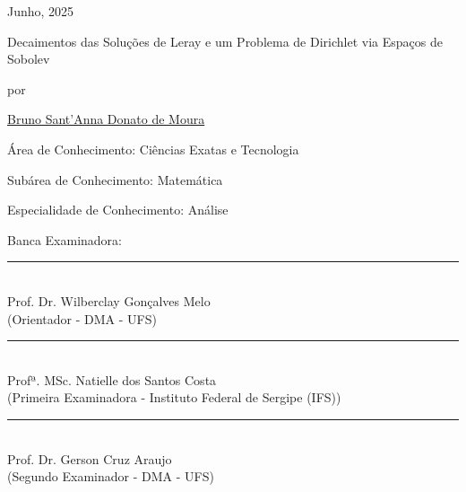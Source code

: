 \vspace{1cm}
\begin{center}
		Junho, 2025
\end{center}

\pagebreak

\thispagestyle{empty}

\begin{center}
\Large{Decaimentos das Soluções de Leray e um Problema de Dirichlet via Espaços de Sobolev}


\vspace{0.5cm}

{por}

\vspace{1.0cm}

\href{http://lattes.cnpq.br/4171937682648273}
{\large{Bruno Sant'Anna Donato de Moura}}
\end{center}

\vspace{1.0cm}

\noindent Área de Conhecimento: Ciências Exatas e Tecnologia

\noindent Subárea de Conhecimento: Matemática

\noindent Especialidade de Conhecimento: Análise

\vspace{1.0cm}

\noindent Banca Examinadora:

\vspace{2.5cm}


\begin{center}
\rule{10cm}{.1mm} \\
{Prof. Dr. Wilberclay Gonçalves Melo } \\
(Orientador - DMA - UFS)
\vspace{0.8cm}


\rule{10cm}{.1mm} \\
{Profª. MSc. Natielle dos Santos Costa} \\
(Primeira Examinadora - Instituto Federal de Sergipe (IFS))
\vspace{0.8cm}


\rule{10cm}{.1mm} \\
{Prof. Dr. Gerson Cruz Araujo} \\
(Segundo Examinador - DMA - UFS)
\vspace{0.8cm}

\end{center}

\pagebreak

\thispagestyle{empty}

\mbox{}

\vspace{19cm}



\pagebreak

